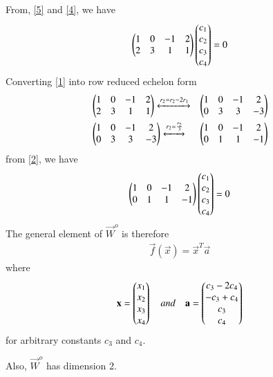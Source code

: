 \documentclass[journal,12pt,twocolumn]{IEEEtran}
\begin{document}
From, \eqref{5} and \eqref{4}, we have
\begin{align}
\begin{pmatrix}1 & 0 & -1 & 2 \\ 2 & 3 & 1 & 1\end{pmatrix}\begin{pmatrix}c_1 \\ c_2 \\ c_3 \\ c_4\end{pmatrix} = 0 \label{1}
\end{align} 
Converting \eqref{1} into row reduced echelon form
\begin{align}
& \begin{pmatrix}1 & 0 & -1 & 2 \\ 2 & 3 & 1 & 1\end{pmatrix} \xleftrightarrow[]{r_2 = r_2 - 2r_1} & \begin{pmatrix}1 & 0 & -1 & 2 \\ 0 & 3 & 3 & -3\end{pmatrix} \\
& \begin{pmatrix}1 & 0 & -1 & 2 \\ 0 & 3 & 3 & -3\end{pmatrix} \xleftrightarrow[]{r_2 = \frac{r_2}{3}} & \begin{pmatrix}1 & 0 & -1 & 2 \\ 0 & 1 & 1 & -1\end{pmatrix} \label{2}
\end{align}
from \eqref{2}, we have
\begin{align}
\begin{pmatrix}1 & 0 & -1 & 2 \\ 0 & 1 & 1 & -1\end{pmatrix}\begin{pmatrix}c_1 \\ c_2 \\ c_3 \\ c_4\end{pmatrix} = 0
\end{align}
The general element of $\vec{W}^{o}$ is therefore
\begin{align}
 \vec{f}(\vec{x}) = \vec{x}^T\vec{a} 
\end{align}
where 
\begin{align}
\mathbf{x} = \begin{pmatrix}x_1 \\ x_2 \\ x_3 \\ x_4\end{pmatrix} \quad and \quad \mathbf{a} = \begin{pmatrix}c_3 - 2c_4 \\ -c_3 + c_4 \\ c_3 \\ c_4 \end{pmatrix}	
\end{align}
for arbitrary constants $c_3$ and $c_4$. 

Also, $\vec{W}^{o}$ has dimension 2.
\end{document}
